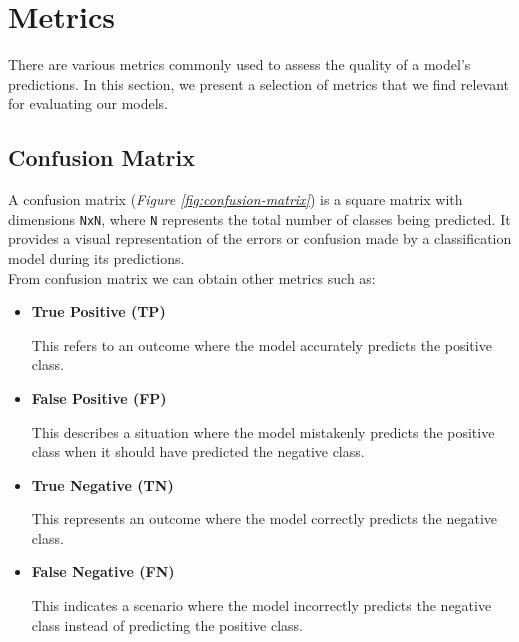 \section{Metrics}
{\label{sec:metrics}}

There are various metrics commonly used to assess the quality of a model's predictions.
In this section, we present a selection of metrics that we find relevant for evaluating our models.

\subsection{Confusion Matrix}

A confusion matrix (\textit{Figure \ref{fig:confusion-matrix}}) is a square matrix with dimensions {\tt NxN},
where {\tt N} represents the total number of classes being predicted.
It provides a visual representation of the errors or confusion made by a classification
model during its predictions. \\

From confusion matrix we can obtain other metrics such as:

\begin{itemize}
\item \textbf{True Positive (TP)}

This refers to an outcome where the model accurately predicts the positive class.
\item \textbf{False Positive (FP)}

This describes a situation where the model mistakenly predicts the positive class when it should have predicted the negative class.
\item \textbf{True Negative (TN)}

This represents an outcome where the model correctly predicts the negative class.
\item \textbf{False Negative (FN)}

This indicates a scenario where the model incorrectly predicts the negative class instead of predicting the positive class.

\end{itemize}

